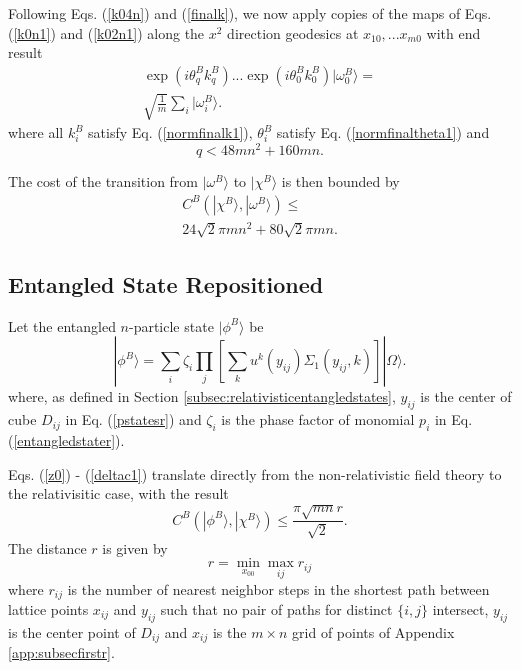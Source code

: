\documentclass[twocolumn,amsmath,amssymb]{revtex4-1}
\begin{document}
Following Eqs. (\ref{k04n}) and (\ref{finalk}), we now
apply copies of the maps
of Eqs. (\ref{k0n1}) and (\ref{k02n1}) along the $x^2$ direction
geodesics at $x_{10}, ... x_{m0}$ with end result
\begin{multline}
\label{finalk1}
\exp( i \theta^B_q k^B_q) ... \exp( i \theta^B_0 k^B_0) |\omega^B_0 \rangle  = \\
\sqrt{\frac{1}{m}} \sum_i |\omega^B_i \rangle .
\end{multline}
where all $k^B_i$ satisfy Eq. (\ref{normfinalk1}),  $\theta^B_i$
satisfy Eq. (\ref{normfinaltheta1}) and
\begin{equation}
  \label{qbound}
  q <  48 m n^2 + 160 m n.
\end{equation}

The cost of the transition from $|\omega^B \rangle $ to $|\chi^B \rangle $ is then bounded
by
\begin{multline}
\label{deltacr}
C^B( |\chi^B \rangle , |\omega^B \rangle ) \le \\ 24 \sqrt{2} \pi m n^2 + 80 \sqrt{2} \pi m n.
\end{multline}


\subsection{\label{app:subsectionsecondr}Entangled State Repositioned}


Let the entangled $n$-particle state
$|\phi^B \rangle $ be
\begin{equation}
\label{phinpoints1}
|\phi^B \rangle  = \sum_{i} \zeta_i \prod_j[ \sum_k u^k( y_{ij}) \Sigma_1( y_{ij}, k)] |\Omega \rangle .
\end{equation}
where, as defined in Section \ref{subsec:relativisticentangledstates},
$y_{ij}$ is the center of cube $D_{ij}$ in Eq. (\ref{pstatesr})
and $\zeta_i$ is the phase factor of monomial $p_i$ in
Eq. (\ref{entangledstater}).

Eqs. (\ref{z0}) - (\ref{deltac1}) translate directly
from the non-relativistic field theory to the relativisitic case,
with the result
\begin{equation}
\label{deltac0r}
C^B( |\phi^B \rangle , |\chi^B \rangle ) \le \frac{ \pi \sqrt{mn} r}{\sqrt{2}}.
\end{equation}
The distance $r$ is given by
\begin{equation}
  \label{defsbar1r}
  r = \min_{x_{00}} \max_{ij} r_{ij}
\end{equation}
where $r_{ij}$ is the number of nearest
neighbor steps in the
shortest path between
lattice points $x_{ij}$ and $y_{ij}$
such that no pair of paths for distinct
$\{i, j\}$ intersect,
$y_{ij}$ is the center point of $D_{ij}$
and $x_{ij}$ is the $m \times n$ grid
of points of Appendix \ref{app:subsecfirstr}.
\end{document}
